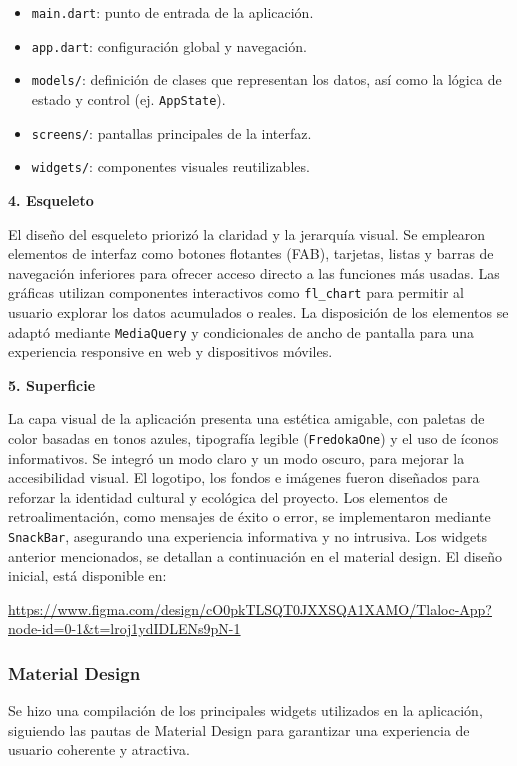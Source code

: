 \begin{itemize}
  \item \texttt{main.dart}: punto de entrada de la aplicación.
  \item \texttt{app.dart}: configuración global y navegación.
  \item \texttt{models/}: definición de clases que representan los datos, así como la lógica de estado y control (ej. \texttt{AppState}). 
  \item \texttt{screens/}: pantallas principales de la interfaz.
  \item \texttt{widgets/}: componentes visuales reutilizables. 
\end{itemize}


\textbf{4. Esqueleto}

El diseño del esqueleto priorizó la claridad y la jerarquía visual. Se emplearon elementos de interfaz como botones flotantes (FAB), tarjetas, listas y barras de navegación inferiores para ofrecer acceso directo a las funciones más usadas. Las gráficas utilizan componentes interactivos como \texttt{fl\_chart} para permitir al usuario explorar los datos acumulados o reales. La disposición de los elementos se adaptó mediante \texttt{MediaQuery} y condicionales de ancho de pantalla para una experiencia responsive en web y dispositivos móviles.

\textbf{5. Superficie}

La capa visual de la aplicación presenta una estética amigable, con paletas de color basadas en tonos azules, tipografía legible (\texttt{FredokaOne}) y el uso de íconos informativos. Se integró un modo claro y un modo oscuro, para mejorar la accesibilidad visual. El logotipo, los fondos e imágenes fueron diseñados para reforzar la identidad cultural y ecológica del proyecto. Los elementos de retroalimentación, como mensajes de éxito o error, se implementaron mediante \texttt{SnackBar}, asegurando una experiencia informativa y no intrusiva.
Los widgets anterior mencionados, se detallan a continuación en el material design. El diseño inicial, está disponible en:
  \begin{center}
    \url{https://www.figma.com/design/cO0pkTLSQT0JXXSQA1XAMO/Tlaloc-App?node-id=0-1&t=lroj1ydIDLENs9pN-1}
  \end{center}


\subsubsection*{Material Design}
Se hizo una compilación de los principales widgets utilizados en la aplicación, siguiendo las pautas de Material Design para garantizar una experiencia de usuario coherente y atractiva.


